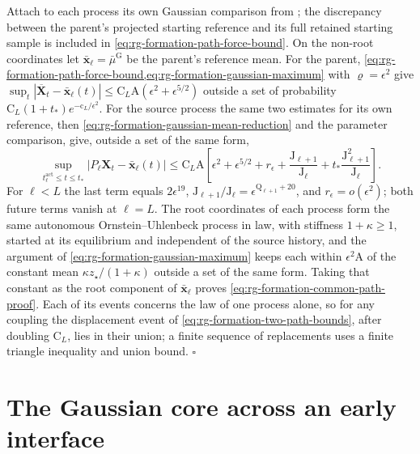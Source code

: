 Attach to each process its own Gaussian comparison from
; the discrepancy between the
parent's projected starting reference and its full retained starting sample is
included in \cref{eq:rg-formation-path-force-bound}. On the non-root
coordinates let \(\bar{\mathbf x}_\ell=\bar\mu^{\mathrm G}\) be the parent's
reference mean. For the parent,
\cref{eq:rg-formation-path-force-bound,eq:rg-formation-gaussian-maximum} with
\(\varrho=\epsilon^2\) give
\(\sup_t|\overline{\mathbf X}_t-\bar{\mathbf x}_\ell(t)|\le\mathrm C_L\mathrm A(\epsilon^2+\epsilon^{5/2})\)
outside a set of probability \(\mathrm C_L(1+t_*)e^{-\mathrm c_L/\epsilon^2}\).
For the source process the same two estimates for its own reference, then
\cref{eq:rg-formation-gaussian-mean-reduction} and the parameter comparison,
give, outside a set of the same form,
\begin{equation}
 \sup_{t^{\mathrm{act}}_\ell\le t\le t_*}|P_\ell\mathbf X_t-\bar{\mathbf x}_\ell(t)|
 \le \mathrm C_L\mathrm A\left[
 \epsilon^2+\epsilon^{5/2}+r_\epsilon
 +\frac{\mathrm J_{\ell+1}}{\mathrm J_\ell}
 +t_*\frac{\mathrm J_{\ell+1}^2}{\mathrm J_\ell}\right].
 \label{eq:rg-formation-continuous-error-terms}
\end{equation}
For \(\ell<L\) the last term equals \(2\epsilon^{19}\),
\(\mathrm J_{\ell+1}/\mathrm J_\ell=\epsilon^{\mathrm Q_{\ell+1}+20}\), and
\(r_\epsilon=o(\epsilon^2)\); both future terms vanish at \(\ell=L\). The root
coordinates of each process form the same autonomous Ornstein--Uhlenbeck
process in law, with stiffness \(1+\kappa\ge1\), started at its equilibrium
and independent of the source history, and the argument of
\cref{eq:rg-formation-gaussian-maximum} keeps each within \(\epsilon^2\mathrm A\)
of the constant mean \(\kappa z_\star/(1+\kappa)\) outside a set of the same
form. Taking that constant as the root component of \(\bar{\mathbf x}_\ell\)
proves \cref{eq:rg-formation-common-path-proof}. Each of its events concerns
the law of one process alone, so for any coupling the displacement event of
\cref{eq:rg-formation-two-path-bounds}, after doubling \(\mathrm C_L\), lies in
their union; a finite sequence of replacements uses a finite triangle
inequality and union bound. \hfill\(\square\)

\section{The Gaussian core across an early interface}
\label{sec:rg-formation-core-proof}

